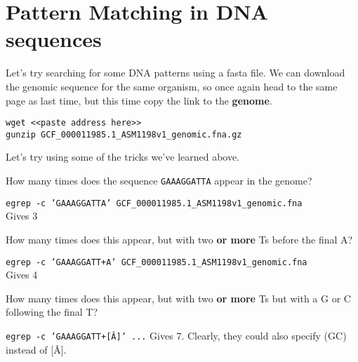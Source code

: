 \section{Pattern Matching in DNA sequences}

Let's try searching for some DNA patterns using a fasta file.
We can download the genomic sequence for the same organism, so once again head to the same page as last time, but this time copy the link to the \textbf{genome}.

\begin{lstlisting}
wget <<paste address here>>
gunzip GCF_000011985.1_ASM1198v1_genomic.fna.gz
\end{lstlisting}

Let's try using some of the tricks we've learned above.

\begin{questions}
How many times does the sequence \texttt{GAAAGGATTA} appear in the genome?\\
\begin{answer}
\texttt{egrep -c 'GAAAGGATTA' GCF\_000011985.1\_ASM1198v1\_genomic.fna} \\
Gives 3\\
\end{answer}
How many times does this appear, but with two \textbf{or more} Ts before the final A?\\
\begin{answer}
\texttt{egrep -c 'GAAAGGATT+A' GCF\_000011985.1\_ASM1198v1\_genomic.fna}\\
Gives 4\\
\end{answer}
How many times does this appear, but with two \textbf{or more} Ts but with a G or C following the final T?\\
\begin{answer}
\texttt{egrep -c 'GAAAGGATT+[\^A]' ...}
Gives 7.
Clearly, they could also specify (GC) instead of [\^A].
\end{answer}
\end{questions}



